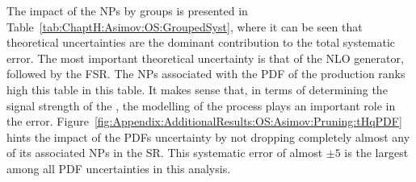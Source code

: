 The impact of the NPs by groups is presented in Table~\ref{tab:ChaptH:Asimov:OS:GroupedSyst},
where it can be seen that theoretical uncertainties are the dominant contribution to the total systematic
error. The most important theoretical uncertainty is that of the \ttbar NLO generator, followed
by the \ttbar FSR.
The NPs associated with the PDF of the \tHq production ranks high this table in this table.
It makes sense that, in terms of determining the signal strength of the \tHq, the modelling of the 
\tHq process plays an important role in the error.
Figure~\ref{fig:Appendix:AdditionalResults:OS:Asimov:Pruning:tHqPDF} hints the 
impact of the \tHq PDFs uncertainty by not dropping completely almost any
of its associated NPs in the SR. This systematic error of almost $\pm 5$
is the largest among all PDF uncertainties in this analysis.



